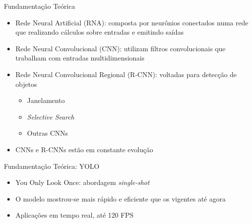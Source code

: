 
\begin{frame}{Fundamentação Teórica}
\begin{itemize}
    \item \alert{Rede Neural Artificial (RNA)}: composta por neurônios conectados numa rede que realizando cálculos sobre entradas e emitindo saídas
    \item \alert{Rede Neural Convolucional (CNN)}: utilizam filtros convolucionais que trabalham com entradas multidimensionais
    \item  \alert{Rede Neural Convolucional Regional (R-CNN)}: voltadas para detecção de objetos
    \begin{itemize}
        \item Janelamento
        \item \emph{Selective Search}
        \item Outras CNNs
    \end{itemize}
    \item CNNs e R-CNNs estão em constante evolução
\end{itemize}
\end{frame}

\begin{frame}{Fundamentação Teórica: YOLO}
\begin{itemize}
    \item \alert{You Only Look Once}: abordagem \emph{single-shot} \cite{Redmon:YOLOoriginal}
    \ \ \newline
    \item O modelo mostrou-se mais rápido e eficiente que os vigentes até agora
    \ \ \newline
    \item Aplicações em tempo real, até 120 FPS
\end{itemize}
\end{frame}

